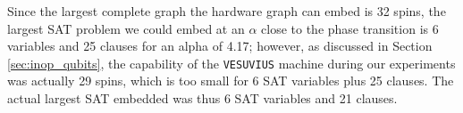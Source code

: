 Since the largest complete graph the hardware graph can embed is 32 spins, the largest SAT problem we could embed at an $\alpha$ close to the phase transition is 6 variables and 25 clauses for an alpha of 4.17; however, as discussed in Section \ref{sec:inop_qubits}, the capability of the \texttt{VESUVIUS} machine during our experiments was actually 29 spins, which is too small for 6 SAT variables plus 25 clauses.  The actual largest SAT embedded was thus 6 SAT variables and 21 clauses.
